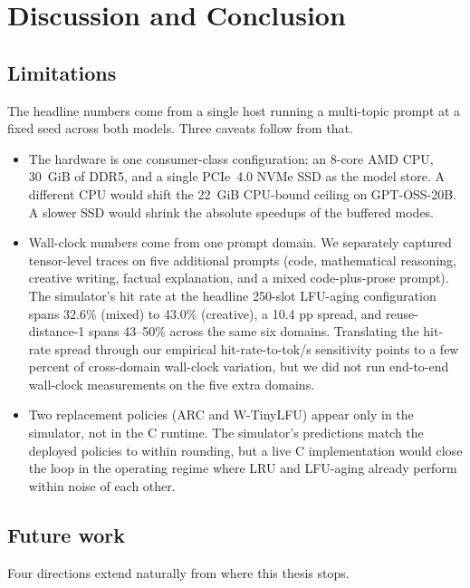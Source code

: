 \chapter{Discussion and Conclusion}\label{chapter:closing}

\section{Limitations}\label{sec:limitations}

The headline numbers come from a single host running a multi-topic prompt at a fixed seed across both models.
Three caveats follow from that.

\begin{itemize}
\item The hardware is one consumer-class configuration: an 8-core AMD CPU, 30~GiB of DDR5, and a single PCIe~4.0 NVMe SSD as the model store.
A different CPU would shift the 22~GiB CPU-bound ceiling on GPT-OSS-20B.
A slower SSD would shrink the absolute speedups of the buffered modes.

\item Wall-clock numbers come from one prompt domain.
We separately captured tensor-level traces on five additional prompts (code, mathematical reasoning, creative writing, factual explanation, and a mixed code-plus-prose prompt).
The simulator's hit rate at the headline 250-slot LFU-aging configuration spans 32.6\% (mixed) to 43.0\% (creative), a 10.4 pp spread, and reuse-distance-1 spans 43--50\% across the same six domains.
Translating the hit-rate spread through our empirical hit-rate-to-tok/s sensitivity points to a few percent of cross-domain wall-clock variation, but we did not run end-to-end wall-clock measurements on the five extra domains.

\item Two replacement policies (ARC and W-TinyLFU) appear only in the simulator, not in the C runtime.
The simulator's predictions match the deployed policies to within rounding, but a live C implementation would close the loop in the operating regime where LRU and LFU-aging already perform within noise of each other.
\end{itemize}


\section{Future work}\label{sec:future-work}

Four directions extend naturally from where this thesis stops.

